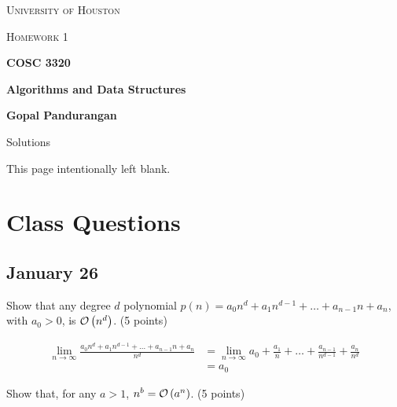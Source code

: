 \documentclass[final]{article}
\begin{document}
\begin{titlepage}
    \begin{center}
        {\scshape\LARGE University of Houston\par}
        \vspace{1cm}
        {\scshape\Large Homework 1 \par}
        \vspace{1.5cm}
        {\huge\bfseries COSC 3320 \par}
        {\huge\bfseries Algorithms and Data Structures \par}
        \vspace{0.5cm}
        {\large\bfseries Gopal Pandurangan\par}
        \vspace{2cm}
        {\Large Solutions\par}
    \end{center}
\end{titlepage}
\vspace*{\fill}\begin{center}{\Huge This page intentionally left blank.}\end{center}\vspace*{\fill}\thispagestyle{empty}\clearpage
{}

\section{Class Questions}
\subsection{January 26}

\begin{question}
    Show that any degree $d$ polynomial $p(n) = a_0n^d + a_1n^{d - 1} + \dots + a_{n-1}n + a_n$, with $a_0 > 0$, is $\mathcal{O}\left(n^d\right)$. (5 points)
\end{question}

\begin{solution}
    \begin{align*}\lim_{n\to\infty}\frac{a_0n^d + a_1n^{d - 1} + \dots + a_{n-1}n + a_n}{n^d}
         & =\lim_{n\to\infty}a_0 + \frac{a_1}{n} + \dots + \frac{a_{n-1}}{n^{d-1}} + \frac{a_n}{n^d} \\
         & = a_0
    \end{align*}
\end{solution}

\begin{question}
    Show that, for any $a > 1$, $n^b = \mathcal{O}\left(a^n\right)$. (5 points)
\end{question}
\end{document}
